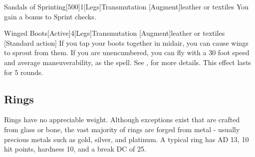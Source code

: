 \begin{magicitemdef}{Sandals of Sprinting}[500]{1}[Legs]{Transmutation [Augment]}{leather or textiles}
     You gain a  bonus to Sprint checks.
\end{magicitemdef}

\begin{magicitemdef}{Winged Boots}[Active]{4}[Legs]{Transmutation [Augment]}{leather or textiles}
    [Standard action] If you tap your boots together in midair, you can cause wings to sprout from them.
    If you are unencumbered, you can fly with a 30 foot speed and average maneuverability, as the  spell.
    See , for more details.
    This effect lasts for 5 rounds.
\end{magicitemdef}

\subsection{Rings}

 Rings have no appreciable weight.
Although exceptions exist that are crafted from glass or bone, the vast majority of rings are forged from metal - usually precious metals such as gold, silver, and platinum.
A typical ring has AD 13, 10 hit points, hardness 10, and a break DC of 25.

\begin{comment}
\begin{dtable}
    \lcaption{Rings}
    \begin{dtabularx}{\columnwidth}{>{\lcol}X l}
        Ring & Market Price \\
        \hline
        Protection \plus1 & 2,000 gp \\
        Feather falling & 2,200 gp \\
        Climbing & 2,500 gp \\
        Jumping & 2,500 gp \\
        Sustenance & 2,500 gp \\
        Swimming & 2,500 gp \\
        Mind shielding & 8,000 gp \\
        Protection \plus2 & 8,000 gp \\
        Climbing, improved & 10,000 gp \\
        Jumping, improved & 10,000 gp \\
        Swimming, improved & 10,000 gp \\
        Energy resistance, minor & 12,000 gp \\
        Protection \plus3 & 18,000 gp \\
        Energy resistance, major & 28,000 gp \\
        Protection \plus4 & 32,000 gp \\
        Energy resistance, greater & 44,000 gp \\
        Protection \plus5 & 50,000 gp \\
    \end{dtabularx}
\end{dtable}
\end{comment}

